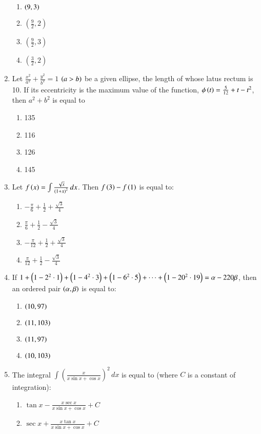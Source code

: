 \documentclass[journal,12pt,onecolumn,draftclsnofoot]{IEEEtran}
\theoremstyle{remark}
\begin{document}
\begin{enumerate}
\begin{enumerate}
    \item $\left(9,3\right)$
    \item $\left(\frac{9}{2},2\right)$
    \item $\left(\frac{9}{2},3\right)$
    \item $\left(\frac{3}{2},2\right)$
\end{enumerate}
\item Let $\frac{x^2}{a^2}+\frac{y^2}{b^2}=1$ $\left(a>b\right)$ be a given ellipse, the length of whose latus rectum is 10. If its eccentricity is the maximum value of the function, $\phi\left(t\right)=\frac{5}{12}+t-t^2$, then $a^2 + b^2$ is equal to
\begin{enumerate}
    \item 135
    \item 116
    \item 126
    \item 145
\end{enumerate}
\item Let $f\left(x\right)=\int\frac{\sqrt{x}}{\left(1+x\right)^2}\, dx$. Then $f\left(3\right)-f\left(1\right)$ is equal to:
\begin{enumerate}
    \item $-\frac{\pi}{6}+\frac{1}{2}+\frac{\sqrt{3}}{4}$
    \item $\frac{\pi}{6}+\frac{1}{2}-\frac{\sqrt{3}}{4}$
    \item $-\frac{\pi}{12}+\frac{1}{2}+\frac{\sqrt{3}}{4}$
    \item $\frac{\pi}{12}+\frac{1}{2}-\frac{\sqrt{3}}{4}$
\end{enumerate}
\item If $1+\left(1-2^2\cdot1\right)+\left(1-4^2\cdot3\right)+\left(1-6^2\cdot5\right)+\cdots+\left(1-20^2\cdot19\right)=\alpha-220\beta$, then an ordered pair $\left(\alpha,\beta\right)$ is equal to:
\begin{enumerate}
    \item $\left(10, 97\right)$
    \item $\left(11, 103\right)$
    \item $\left(11, 97\right)$
    \item $\left(10,103\right)$
\end{enumerate}
\item The integral $\int\left(\frac{x}{x\sin x+\cos x}\right)^2\,dx$ is equal to (where $C$ is a constant of integration):
\begin{enumerate}
    \item $\tan x-\frac{x\sec x}{x\sin x+\cos x}+C$
    \item $\sec x+\frac{x\tan x}{x\sin x+\cos x}+C$

\end{enumerate}
\end{enumerate}
\end{document}
